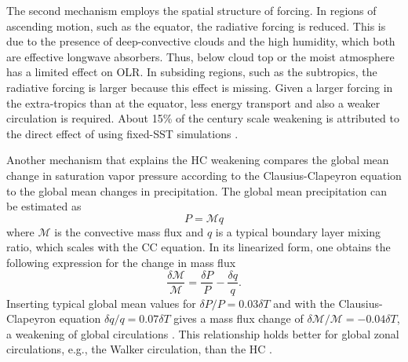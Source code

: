 The second mechanism employs the spatial structure of \CO{} forcing. In regions of ascending motion, such as the equator, the \CO{} radiative forcing is reduced. This is due to the presence of deep-convective clouds and the high humidity, which both are effective longwave absorbers. Thus, \CO{} below cloud top or the moist atmosphere has a limited effect on OLR.
In subsiding regions, such as the subtropics, the \CO{} radiative forcing is larger because this effect is missing. Given a larger forcing in the extra-tropics than at the equator, less energy transport and also a weaker circulation is required. About 15\% of the century scale weakening is attributed to the direct effect of \CO{} using fixed-SST simulations \parencite{merlisDirectWeakeningTropical2015}.

Another mechanism that explains the HC weakening compares the global mean change in saturation vapor pressure according to the Clausius-Clapeyron equation to the global mean changes in precipitation. The global mean precipitation can be estimated as
\begin{equation}
    P = \mathcal{M}q
\end{equation}
where $\mathcal{M}$ is the convective mass flux and $q$ is a typical boundary layer mixing ratio, which scales with the CC equation. In its linearized form, one obtains the following expression for the change in mass flux
\begin{equation}
    \frac{\delta \mathcal{M}}{\mathcal{M}} = \frac{\delta P}{P} -\frac{\delta q}{q}.
\end{equation}
Inserting typical global mean values for ${\delta P}/{P}=0.03\delta T$ and with the Clausius-Clapeyron equation ${\delta q}/{q}=0.07\delta T$ gives a mass flux change of ${\delta \mathcal{M}}/{\mathcal{M}}=-0.04\delta T$, a weakening of global circulations
\parencite{heldRobustResponsesHydrological2006}. This relationship holds better for global zonal circulations, e.g., the Walker circulation, than the HC \parencite{vecchiGlobalWarmingWeakening2007}.



